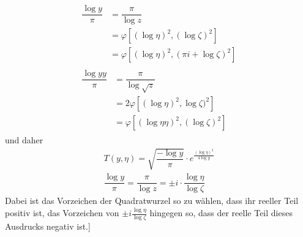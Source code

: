\[
\begin{gathered}\begin{aligned}\dfrac{\log y}{\pi}&=\dfrac{\pi}{\log z}\\[7pt]&=\varphi[(\log\eta)^2,(\log\zeta)^2]\\[7pt]&=\varphi[(\log\eta)^2,(\pi i+\log\zeta)^2]\end{aligned}\\[10pt]\begin{aligned}\dfrac{\log yy}{\pi}&=\dfrac{\pi}{\log\surd  z}\\[7pt]&=2\varphi[(\log\eta)^2,\log\zeta)^2]\\[7pt]&=\varphi[(\log\eta\eta)^2,(\log\zeta)^2]\end{aligned}\end{gathered}
\]
und daher
\[
\begin{gathered}
T(y,\eta)=\surd {\dfrac{-\log y}{\pi}}\cdot e^{\frac{(\log\eta)^2}{4\log y}}\\[7pt]
\dfrac{\log y}{\pi}=\dfrac{\pi}{\log z}=\mathbin{\pm}i\cdot\dfrac{\log\eta}{\log\zeta}
\end{gathered}
\]
Dabei ist das Vorzeichen der Quadratwurzel so zu wählen, dass ihr reeller Teil positiv ist, das Vorzeichen von $\mathbin{\pm}i\frac{\log\eta}{\log\zeta}$ hingegen so, dass der reelle Teil dieses Ausdrucks negativ ist.]

\clearpage
\endgroup
